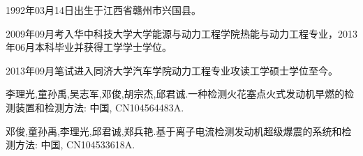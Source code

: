 \begin{resume}
  
  1992年03月14日出生于江西省赣州市兴国县。\par
  2009年09月考入华中科技大学大学能源与动力工程学院热能与动力工程专业，2013年06月本科毕业并获得工学学士学位。\par
  2013年09月笔试进入同济大学汽车学院动力工程专业攻读工学硕士学位至今。
  
  \begin{enumerate}[{[}1{]}]
  \item 李理光,童孙禹,吴志军,邓俊,胡宗杰,邱君诚.一种检测火花塞点火式发动机早燃的检测装置和检测方法: 中国, CN104564483A.
  \item 邓俊,童孙禹,李理光,邱君诚,郑兵艳.基于离子电流检测发动机超级爆震的系统和检测方法: 中国, CN104533618A.
  \end{enumerate}
\end{resume}
